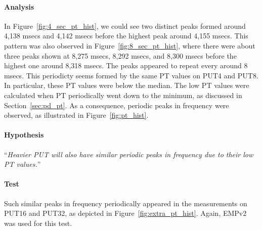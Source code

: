 \documentclass[10pt]{article}
\begin{document}
\paragraph{Analysis} In Figure~\ref{fig:4_sec_pt_hist}, we could see two distinct peaks 
formed around 4,138 msecs and 4,142 msecs before the highest peak around 4,155 msecs. 
This pattern was also observed in Figure~\ref{fig:8_sec_pt_hist}, 
where there were about three peaks shown at 8,275 msecs, 8,292 msecs, and 8,300 msecs 
before the highest one around 8,318 msecs. 
The peaks appeared to repeat every around 8 msecs. 
This periodicty seems formed by the same PT values on PUT4 and PUT8. 
In particular, these PT values were below the median. 
The low PT values were calculated when PT periodically went down to the minimum, 
as discussed in Section~\ref{sec:pd_pt}. 
As a consequence, periodic peaks in frequency were observed, as illustrated in Figure~\ref{fig:pt_hist}. 

\paragraph{Hypothesis} ``{\it Heavier PUT will also have similar periodic peaks in frequency due to their low PT values.}'' 

\paragraph{Test} 
Such similar peaks in frequency periodically 
appeared in the measurements on PUT16 and PUT32, as depicted in Figure~\ref{fig:extra_pt_hist}. 
Again, EMPv2 was used for this test.
\end{document}
